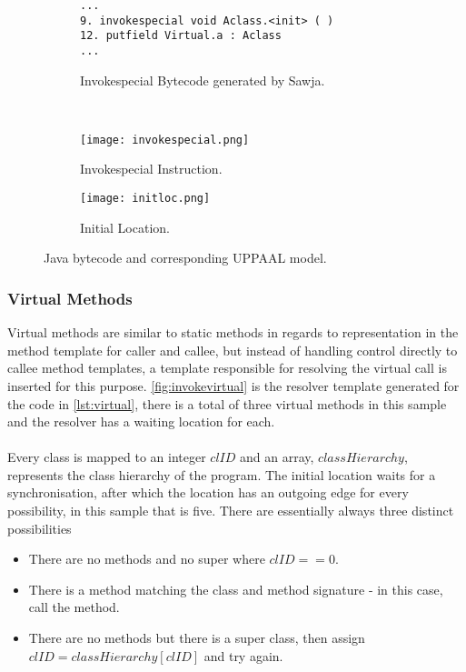 \begin{figure}[H]
\centering
\begin{subfigure}{\textwidth}
  \begin{lstlisting}[numbers=none]
...
9. invokespecial void Aclass.<init> ( )
12. putfield Virtual.a : Aclass
...
  \end{lstlisting}
  \caption{Invokespecial Bytecode generated by Sawja.}
\end{subfigure} \\
\begin{subfigure}{.65\textwidth}
  \texttt{[image: invokespecial.png]}
  \caption{Invokespecial Instruction.}
\end{subfigure}
\hspace{10px}
\begin{subfigure}{.25\textwidth}
  \texttt{[image: initloc.png]}
  \caption{Initial Location.}
\end{subfigure}
\caption{Java bytecode and corresponding UPPAAL model.}
\label{fig:invokespecial}
\end{figure}


\subsubsection{Virtual Methods}
Virtual methods are similar to static methods in regards to representation in the method template for caller and callee, but instead of handling control directly to callee method templates, a template responsible for resolving the virtual call is inserted for this purpose.
\cref{fig:invokevirtual} is the resolver template generated for the code in \cref{lst:virtual}, there is a total of three virtual methods in this sample and the resolver has a waiting location for each.\\\\
Every class is mapped to an integer $clID$ and an array, $classHierarchy$, represents the class hierarchy of the program. The initial location  waits for a synchronisation, after which the location  has an outgoing edge for every possibility, in this sample that is five. There are essentially always three distinct possibilities 

\begin{itemize}
\item There are no methods and no super where $clID == 0$.
\item There is a method matching the class and method signature - in this case, call the method.
\item There are no methods but there is a super class, then assign $clID = classHierarchy[clID]$ and try again.
\end{itemize}

